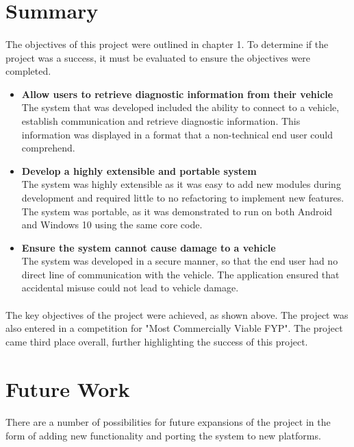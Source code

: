 \section{Summary}
	\paragraph{}{
	The objectives of this project were outlined in chapter 1. To determine if the project was a success, it must be evaluated to ensure the objectives were completed. 
		\begin{itemize}
			\item \textbf{Allow users to retrieve diagnostic information from their vehicle}\\
			The system that was developed included the ability to connect to a vehicle, establish communication and retrieve diagnostic information. This information was displayed in a format that a non-technical end user could comprehend.
			
			\item \textbf{Develop a highly extensible and portable system}\\
			The system was highly extensible as it was easy to add new modules during development and required little to no refactoring to implement new features. The system was portable, as it was demonstrated to run on both Android and Windows 10 using the same core code. 

			\item \textbf{Ensure the system cannot cause damage to a vehicle}\\
			The system was developed in a secure manner, so that the end user had no direct line of communication with the vehicle. The application ensured that accidental misuse could not lead to vehicle damage. 
		\end{itemize}
	}
	\paragraph{}{
	The key objectives of the project were achieved, as shown above. The project was also entered in a competition for "Most Commercially Viable FYP". The project came third place overall, further highlighting the success of this project.
	}
\section{Future Work}
	\paragraph{}{
	There are a number of possibilities for future expansions of the project in the form of adding new functionality and porting the system to new platforms.
	}
			
